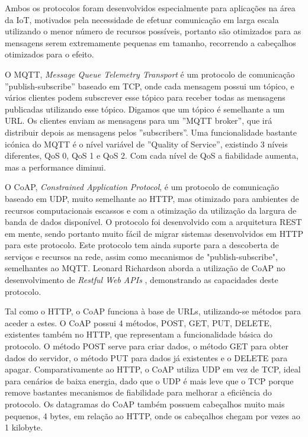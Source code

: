 Ambos os protocolos foram desenvolvidos especialmente para aplicações na área da IoT, motivados pela necessidade de efetuar comunicação em larga escala utilizando o menor número de recursos possíveis, portanto são otimizados para as mensagens serem extremamente pequenas em tamanho, recorrendo a cabeçalhos otimizados para o efeito.

O MQTT\cite{mqtt-rfc}, \textit{Message Queue Telemetry Transport} é um protocolo de comunicação ''publish-subscribe'' baseado em TCP, onde cada mensagem possui um tópico, e vários clientes podem subscrever esse tópico para receber todas as mensagens publicadas utilizando esse tópico. Digamos que um tópico é semelhante a um URL. Os clientes enviam as mensagens para um ''MQTT broker'', que irá distribuir depois as mensagens pelos ''subscribers''. Uma funcionalidade bastante icónica do MQTT é o nível variável de ''Quality of Service'', existindo 3 níveis diferentes, QoS 0, QoS 1 e QoS 2. Com cada nível de QoS a fiabilidade aumenta, mas a performance diminui.

O CoAP\cite{coap-rfc}, \textit{Constrained Application Protocol}, é um protocolo de comunicação baseado em UDP, muito semelhante ao HTTP, mas otimizado para ambientes de recursos computacionais escassos e com a otimização da utilização da largura de banda de dados disponível. O protocolo foi desenvolvido com a arquitetura REST em mente, sendo portanto muito fácil de migrar sistemas desenvolvidos em HTTP para este protocolo. Este protocolo tem ainda suporte para a descoberta de serviços e recursos na rede, assim como mecanismos de "publish-subscribe", semelhantes ao MQTT. Leonard Richardson aborda a utilização de CoAP no desenvolvimento de \textit{Restful Web APIs} \cite{richardson2013restful}, demonstrando as capacidades deste protocolo. 

Tal como o HTTP, o CoAP funciona à base de URLs, utilizando-se métodos para aceder a estes. O CoAP possui 4 métodos, POST, GET, PUT, DELETE, existentes também no HTTP, que representam a funcionalidade básica do protocolo. O método POST serve para criar dados, o método GET para obter dados do servidor, o método PUT para dados já existentes e o DELETE para apagar. Comparativamente ao HTTP, o CoAP utiliza UDP em vez de TCP, ideal para cenários de baixa energia, dado que o UDP é mais leve que o TCP porque remove bastantes mecanismos de fiabilidade para melhorar a eficiência do protocolo. Os datagramas do CoAP também possuem cabeçalhos muito mais pequenos, 4 bytes, em relação ao HTTP, onde os cabeçalhos chegam por vezes ao 1 kilobyte.

